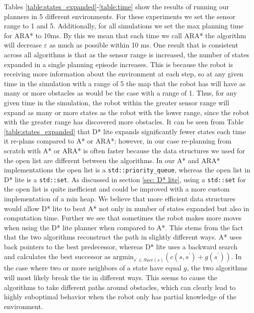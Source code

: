 \documentclass{article}
\begin{document}
Tables \ref{table:states_expanded}-\ref{table:time} show the results of running our planners in 5 different environments. For these experiments we set the sensor range to 1 and 5. Additionally, for all simulations we set the max planning time for ARA* to 10ms. By this we mean that each time we call ARA* the algorithm will decrease $\varepsilon$ as much as possible within 10 ms. One result that is consistent across all algorithms is that as the sensor range is increased, the number of states expanded in a single planning episode increases. This is because the robot is receiving more information about the environment at each step, so at any given time in the simulation with a range of 5 the map that the robot has will have as many or more obstacles as would be the case with a range of 1. Thus, for any given time in the simulation, the robot within the greater sensor range will expand as many or more states as the robot with the lower range, since the robot with the greater range has discovered more obstacles.  It can be seen from Table \ref{table:states_expanded} that D* lite expands significantly fewer states each time it re-plans compared to A* or ARA*; however, in our case re-planning from scratch with A* or ARA* is often faster because the data structures we used for the open list are different between the algorithms. In our A* and ARA* implementations the open list is a \texttt{std::priority\_queue}, whereas the open list in D* lite is a \texttt{std::set}. As discussed in section \ref{sec: D* lite}, using a \texttt{std::set} for the open list is quite inefficient and could be improved with a more custom implementation of a min heap. We believe that more efficient data structures would allow D* lite to beat A* not only in number of states expanded but also in computation time. Further we see that sometimes the robot makes more moves when using the D* lite planner when compared to A*. This stems from the fact that the two algorithms reconstruct the path in slightly different ways. A* uses back pointers to the best predecessor, whereas D* lite uses a backward search and calculates the best successor as $\text{argmin}_{s^{'} \in Succ(s)} (c(s,s^{'})+g(s^{'}))$. In the case where two or more neighbors of a state have equal $g$, the two algorithms will most likely break the tie in different ways. This seems to cause the algorithms to take different paths around obstacles, which can clearly lead to highly suboptimal behavior when the robot only has partial knowledge of the environment.   
\end{document}
